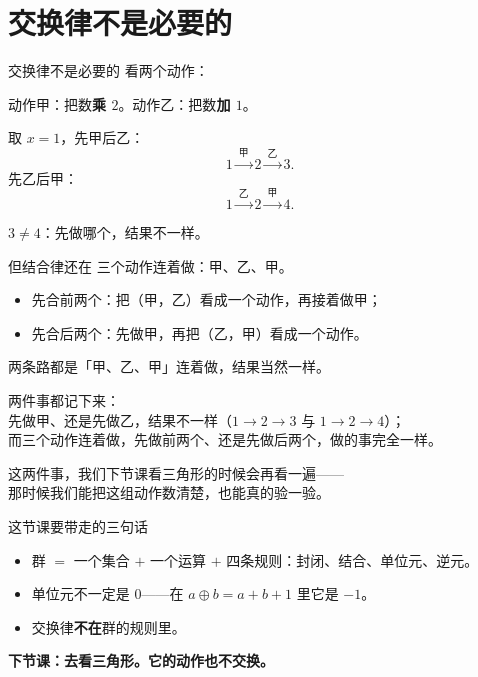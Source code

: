 \documentclass[10pt]{beamer}
\begin{document}
\section{交换律不是必要的}

\begin{frame}{交换律不是必要的}
  看两个动作：
  \begin{block}{}
    动作甲：把数\textbf{乘 \(2\)}。\qquad 动作乙：把数\textbf{加 \(1\)}。
  \end{block}
  \pause
  取 \(x=1\)，先甲后乙：
  \[
    1 \xrightarrow{\ \text{甲}\ } 2 \xrightarrow{\ \text{乙}\ } 3 .
  \]
  \pause
  先乙后甲：
  \[
    1 \xrightarrow{\ \text{乙}\ } 2 \xrightarrow{\ \text{甲}\ } 4 .
  \]
  \pause
  \begin{center}
    {\large \(3\neq4\)：先做哪个，结果不一样。}
  \end{center}
\end{frame}

\begin{frame}{但结合律还在}
  三个动作连着做：甲、乙、甲。
  \begin{itemize}
    \item 先合前两个：把（甲，乙）看成一个动作，再接着做甲；
    \item 先合后两个：先做甲，再把（乙，甲）看成一个动作。
  \end{itemize}
  \pause
  \begin{center}
    {\large 两条路都是「甲、乙、甲」连着做，结果当然一样。}
  \end{center}
  \pause
  \begin{att}
    两件事都记下来：\\
    先做甲、还是先做乙，结果不一样（\(1\to2\to3\) 与 \(1\to2\to4\)）；\\
    而三个动作连着做，先做前两个、还是先做后两个，做的事完全一样。
  \end{att}
  \pause
  \begin{center}
    {\large 这两件事，我们下节课看三角形的时候会再看一遍——\\
    那时候我们能把这组动作数清楚，也能真的验一验。}
  \end{center}
\end{frame}

\begin{frame}{这节课要带走的三句话}
  \begin{itemize}
    \item 群 \(=\) 一个集合 \(+\) 一个运算 \(+\) 四条规则：封闭、结合、单位元、逆元。
    \item 单位元不一定是 \(0\)——在 \(a\oplus b=a+b+1\) 里它是 \(-1\)。
    \item 交换律\textbf{不在}群的规则里。
  \end{itemize}
  \pause
  \begin{center}
    {\large\textcolor{textgreen}{\bfseries 下节课：去看三角形。它的动作也不交换。}}
  \end{center}
\end{frame}
\end{document}
